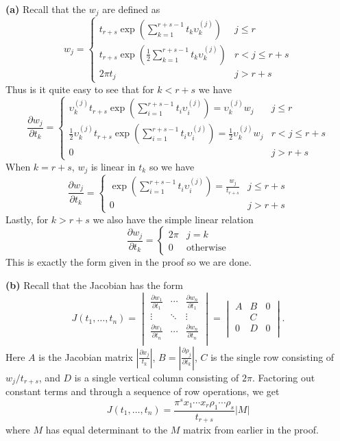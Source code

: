 \documentclass[11pt,letterpaper]{article}
\begin{document}
\begin{solution}
    \textbf{(a)} Recall that the $w_j$ are defined as 
    \[
        w_j=\begin{cases}
            t_{r+s}\exp\left(\sum^{r+s-1}_{k=1}t_k\upsilon_k^{(j)}\right)& j \leq r\\
            t_{r+s}\exp\left(\frac12\sum^{r+s-1}_{k=1}t_k\upsilon^{(j)}_k\right) & r<j\leq r+s\\
            2\pi t_j & j>r+s
        \end{cases}
    \] 
    Thus is it quite easy to see that for $k<r+s$ we have
    \[
        \frac{\partial w_j}{\partial t_k} = \begin{cases}
            \upsilon_k^{(j)} t_{r+s}\exp\left(\sum^{r+s-1}_{i=1}t_i\upsilon_i^{(j)}\right) = \upsilon_k^{(j)}w_j& j \leq r\\
            \frac12\upsilon_k^{(j)} t_{r+s}\exp\left(\sum^{r+s-1}_{i=1}t_i\upsilon_i^{(j)}\right) = \frac12\upsilon_k^{(j)}w_j& r < j\leq r+s\\
            0& j>r+s
        \end{cases}
    \]
    When $k=r+s$, $w_j$ is linear in $t_k$ so we have
    \[
        \frac{\partial w_j}{\partial t_k} = \begin{cases}
            \exp\left(\sum^{r+s-1}_{i=1}t_i\upsilon_i^{(j)}\right) = \frac{w_j}{t_{r+s}}&j\leq r+s\\
            0 & j > r+s
        \end{cases}
    \] 
    Lastly, for $k>r+s$ we also have the simple linear relation
    \[
        \frac{\partial w_j}{\partial t_k} = \begin{cases}
            2\pi & j=k\\
            0 &\textrm{otherwise}
        \end{cases}
    \]
    This is exactly the form given in the proof so we are done.

    \textbf{(b)} Recall that the Jacobian has the form
    \[
        J(t_1,\ldots,t_n)=\begin{vmatrix}
            \frac{\partial w_1}{\partial t_1}&\cdots &\frac{\partial w_n}{\partial t_1}\\
            \vdots & \ddots & \vdots\\
            \frac{\partial w_1}{\partial t_n}&\cdots & \frac{\partial w_n}{\partial t_n}\\
        \end{vmatrix}=\begin{vmatrix}
            A & B & 0\\
              & C & \\
            0 & D & 0 \\
        \end{vmatrix}
    .\] 
    Here $A$ is the Jacobian matrix $\left|\frac{\partial x_j}{t_k}\right|$, $B=\left|\frac{\partial \rho_j}{\partial t_k}\right|$, $C$ is the single row consisting of $w_j/t_{r+s}$, and $D$ is a single vertical column consisting of $2\pi$. Factoring out constant terms and through a sequence of row operations, we get
    \[
        J(t_1,\ldots,t_n)=\frac{\pi^s x_1\cdots x_r \rho_1\cdots \rho_s}{t_{r+s}} |M|
    \]
    where $M$ has equal determinant to the $M$ matrix from earlier in the proof.


\end{solution}
\end{document}
